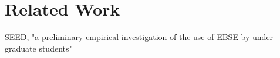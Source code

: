 \section{Related Work}
\label{sec:related work}

SEED, "a preliminary empirical investigation of the use of EBSE by under-graduate students"